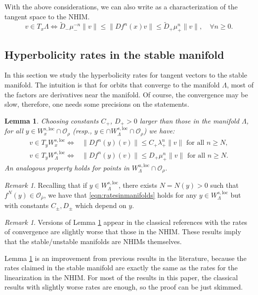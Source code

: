 \documentclass[11pt]{amsart}
\newtheorem{lem}[thm]{Lemma}
\theoremstyle{definition}
\theoremstyle{remark}
\newtheorem{rem}[thm]{Remark}
\numberwithin{equation}{section}
\newcommand{\OO}{\mathcal{O}}
\begin{document}
With the above considerations,  we can also write as
a characterization of the tangent space to the NHIM.
\[
  v \in T_x \Lambda \iff \tilde D_-  \mu_-^{-n} \|v\|
  \le \| Df^n(x)v\| \le \tilde D_+  \mu_+ ^n \|v\|, \quad \forall n \ge 0.
  \]

  \subsection{Hyperbolicity rates in the stable manifold}
  \label{sec:globalrates}

  In this section we study the hyperbolicity rates for
  tangent vectors to the stable manifold. The intuition is that
  for orbits that converge to the manifold $\Lambda$,
  most of the factors are derivatives near the manifold.
  Of course, the convergence may be slow, therefore, one needs
  some precisions on the statements.

\begin{lem}\label{lem:globalrates}
Choosing   constants $C_+$, $D_+>0$
larger than  those in the manifold $\Lambda$,  for all $y \in W^{s,\mathrm{loc}}_{x}\cap\OO_\rho$ (resp., $y\in \cap W^{s,\mathrm{loc}}_{\Lambda}\cap\OO_\rho$) we have:
\begin{equation}\label{eqn:ratesinmanifolds}
\begin{split}
 v\in T_yW^{s,\mathrm{loc}}_{x} \Leftrightarrow&\| Df^n(y)(v)\|\leq  C_+\lambda_+^n\|v\| \textrm{ for all } n\geq N,\\
v\in T_yW^{s,\mathrm{loc}}_{\Lambda}\Leftrightarrow&\| Df^n(y)(v)\|\leq  D_+\mu_+^n\|v\| \textrm{ for all } n\geq N.
\end{split}
\end{equation}
An analogous property holds for points in $W^{u,\mathrm{loc}}_\Lambda\cap \OO_\rho$.
\end{lem}



\begin{rem}\label{rem:globalrates}
Recalling that if
$y\in W^{s,\mathrm{loc}}_\Lambda$, there exists $N=N(y) > 0 $ such
that $f^N(y) \in \OO_{\bar \rho}$, we have
that \eqref{eqn:ratesinmanifolds} holds for  any
$y\in W^{s,\mathrm{loc}}_\Lambda$ but with constants $C_\pm, D_\pm$
which depend on $y$.
\end{rem}


\begin{rem} Versions of Lemma \ref{lem:globalrates} appear in the classical references
with the rates of convergence are
slightly worse that those in the NHIM.
These results imply that the stable/unstable manifolds are NHIMs themselves.

Lemma \ref{lem:globalrates} is an improvement from previous results in the literature,
because  the rates claimed in the stable manifold are  exactly
the same as the rates for the linearization in the NHIM.
For most of the results in this paper, the
classical results with slightly worse rates are enough,
so the proof can be just skimmed.
\end{rem}
\end{document}
